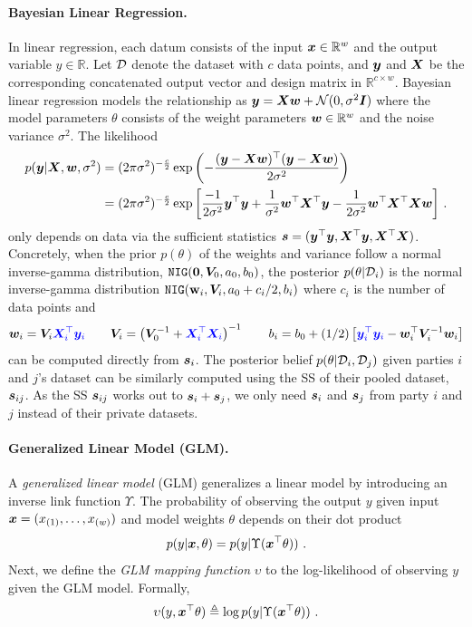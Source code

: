 \documentclass{article}
\theoremstyle{plain}
\theoremstyle{definition}
\theoremstyle{remark}
\begin{document}
\paragraph{Bayesian Linear Regression.}
In linear regression, each datum consists of the input ${\bm{x}} \in \mathbb{R}^w$ and the output variable $y \in \mathbb{R}$. 
Let ${\mathcal{D}}$ denote the dataset with $c$ data points, and ${\bm{y}}$ and ${\bm{X}}$ be the corresponding concatenated output vector and design matrix in $\mathbb{R}^{c \times w}$.
Bayesian linear regression models the relationship as ${\bm{y}} = {\bm{X}} {\bm{w}} + \mathcal{N}(0, \sigma^2{\bm{I}})$ where the model parameters $\theta$ consists of the weight parameters ${\bm{w}} \in \mathbb{R}^w$ and the noise variance $\sigma^2$. The likelihood
\begin{align*}
 p({\bm{y}} | {\bm{X}}, {\bm{w}}, \sigma^2) &= (2 \pi \sigma^2)^{-\frac{c}{2}} \exp{\left( -\frac{({\bm{y}}-{\bm{X}}{\bm{w}})^\top ({\bm{y}}-{\bm{X}}{\bm{w}})}{2\sigma^2}\right)} \\
&= (2 \pi \sigma^2)^{-\frac{c}{2}} \exp{\left[\frac{-1}{2\sigma^2}{\bm{y}}^\top {\bm{y}}+ \frac{1}{\sigma^2}{\bm{w}}^\top {\bm{X}}^\top {\bm{y}}- \frac{1}{2\sigma^2}{\bm{w}}^\top {\bm{X}}^\top {\bm{X}}{\bm{w}}\right]}\ . 
\end{align*}
only depends on data via the sufficient statistics ${\bm{s}} = ({\bm{y}}^\top {\bm{y}}, {\bm{X}}^\top {\bm{y}}, {\bm{X}}^\top {\bm{X}})$. 
Concretely, when the prior $p(\theta)$ of the weights and variance follow a normal inverse-gamma distribution, $\texttt{NIG}(\mathbf{0}, {\bm{V}}_0, a_0, b_0)$, the posterior $p(\theta | {\mathcal{D}}_i)$ is the normal inverse-gamma distribution
$\texttt{NIG}(\mathbf{w}_i, {\bm{V}}_i, a_0 + c_i/2, b_i)$ where $c_i$ is the number of data points and
\[
    {\bm{w}}_i = {\bm{V}}_i \textcolor{blue}{{\bm{X}}_i^\top {\bm{y}}_i} 
     \qquad
    {\bm{V}}_i = \left(  {\bm{V}}_0^{-1} + \textcolor{blue}{{\bm{X}}_i^\top {\bm{X}}_i} \right)^{-1} 
     \qquad
    b_i = b_0 + (1/2) \left[ \textcolor{blue}{{\bm{y}}_i^\top {\bm{y}}_i} - {\bm{w}}_i^\top {\bm{V}}_i^{-1} {\bm{w}}_i \right]
\]
can be computed directly from ${\bm{s}}_i$.
The posterior belief $p(\theta | {\mathcal{D}}_i, {\mathcal{D}}_j)$ given parties $i$ and $j$'s dataset can be similarly computed using the SS of their pooled dataset, ${\bm{s}}_{ij}$. As the SS ${\bm{s}}_{ij}$ works out to ${\bm{s}}_i + {\bm{s}}_j$, we only need ${\bm{s}}_i$ and ${\bm{s}}_j$ from party $i$ and $j$ instead of their private datasets.


\paragraph{Generalized Linear Model (GLM).}
A \emph{generalized linear model} (GLM) generalizes a linear model by introducing an inverse link function $\Upsilon$. The probability of observing the output $y$ given input ${\bm{x}} = (x_{(1)}, \dots, x_{(w)})$ and model weights $\theta$ depends on their dot product
\[
    p(y | {\bm{x}}, \theta) = p(y | \Upsilon({\bm{x}}^\top \theta))\ .
\]
Next, we define the \emph{GLM mapping function} $\upsilon$ to the log-likelihood of observing $y$ given the GLM model. Formally,
\[
    \upsilon(y, \vx^\top \theta) \triangleq \log  p(y | \Upsilon(\vx^\top \theta))\ . 
\]
\end{document}
